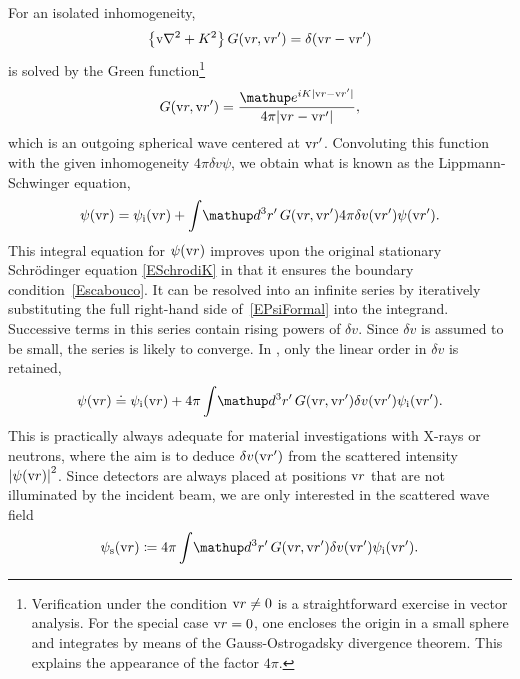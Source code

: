 For an isolated inhomogeneity,
\begin{equation}\label{EHelmholtzForGreen}
  \left\{\text{v}{\nabla}^2+K^2\right\}G(\text{v}{r},\text{v}{r}') = \delta(\text{v}{r}-\text{v}{r}')
\end{equation}
%
%
is solved by the Green function\footnote
{Verification under the condition $\text{v}{r}\ne0$
is a straightforward exercise in vector analysis.
For the special case $\text{v}{r}=0$,
one encloses the origin in a small sphere
and integrates by means of the Gauss-Ostrogadsky divergence theorem.
This explains the appearance of the factor $4\pi$.}
\begin{equation}\label{EGreens1}
  G(\r,\r') = \frac{\e^{iK|\r-\r'|}}{4\pi |\r-\r'|},
\end{equation}
which is an outgoing spherical wave centered at $\text{v}{r}'$.
Convoluting this function with the given inhomogeneity $4\pi\delta v\psi$,
we obtain what is known as the Lippmann-Schwinger equation,
\begin{equation}\label{EPsiFormal}
  \psi(\r)
  = \psi_\si(\r)
  + \int\!\d^3r'\, G(\r,\r') 4\pi\delta v(\r')\psi(\r').
\end{equation}
This integral equation for $\psi(\text{v}{r})$ improves
upon the original stationary Schrödinger equation \cref{ESchrodiK}
in that it ensures the boundary condition~\cref{Escabouco}.
It can be resolved into an infinite series
by iteratively substituting the full right-hand side of~\cref{EPsiFormal}
into the integrand.
Successive terms in this series contain rising powers of $\delta v$.
Since $\delta v$ is assumed to be small, the series is likely to converge.
In ,
only the linear order in $\delta v$ is retained,
\begin{equation}\label{EBorn}
  \psi(\r)
  \doteq \psi_\si(\r)
  + 4\pi \int\!\d^3r'\, G(\r,\r') \delta v(\r') \psi_\si(\r').
\end{equation}
This is practically always adequate for
material investigations with X-rays or neutrons,
where the aim is to
deduce $\delta v(\text{v}{r}')$ from the scattered intensity ${|\psi(\text{v}{r})|}^2$.
Since detectors are always placed at positions $\text{v}{r}$
that are not illuminated by the incident beam,
we are only interested in the scattered wave field
\begin{equation}\label{EBornS}
  \psi_\text{s}(\r)
  \coloneqq
  4\pi \int\!\d^3r'\, G(\r,\r') \delta v(\r') \psi_\si(\r').
\end{equation}
%
%

